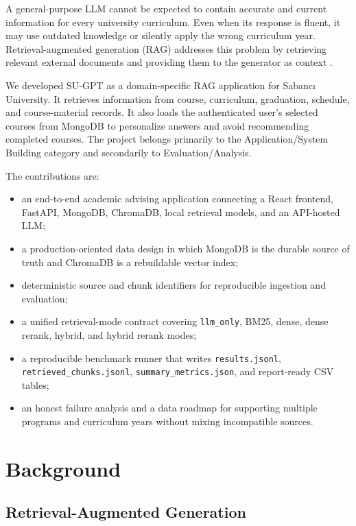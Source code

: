 \documentclass[10pt,a4paper]{article}
\newcommand{\code}[1]{\texttt{\small #1}}
\begin{document}
A general-purpose LLM cannot be expected to contain accurate and current information for every university curriculum. Even when its response is fluent, it may use outdated knowledge or silently apply the wrong curriculum year. Retrieval-augmented generation (RAG) addresses this problem by retrieving relevant external documents and providing them to the generator as context \cite{lewis2020rag}.

We developed SU-GPT as a domain-specific RAG application for Sabancı University. It retrieves information from course, curriculum, graduation, schedule, and course-material records. It also loads the authenticated user's selected courses from MongoDB to personalize answers and avoid recommending completed courses. The project belongs primarily to the Application/System Building category and secondarily to Evaluation/Analysis.

The contributions are:
\begin{itemize}
    \item an end-to-end academic advising application connecting a React frontend, FastAPI, MongoDB, ChromaDB, local retrieval models, and an API-hosted LLM;
    \item a production-oriented data design in which MongoDB is the durable source of truth and ChromaDB is a rebuildable vector index;
    \item deterministic source and chunk identifiers for reproducible ingestion and evaluation;
    \item a unified retrieval-mode contract covering \code{llm\_only}, BM25, dense, dense rerank, hybrid, and hybrid rerank modes;
    \item a reproducible benchmark runner that writes \code{results.jsonl}, \code{retrieved\_chunks.jsonl}, \code{summary\_metrics.json}, and report-ready CSV tables;
    \item an honest failure analysis and a data roadmap for supporting multiple programs and curriculum years without mixing incompatible sources.
\end{itemize}

\section{Background}

\subsection{Retrieval-Augmented Generation}
\end{document}
